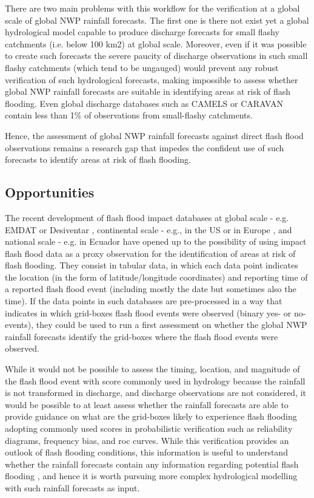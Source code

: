 There are two main problems with this workflow for the verification at a global scale of global NWP rainfall forecasts. The first one is there not exist yet a global hydrological model capable to produce discharge forecasts for small flashy catchments (i.e. below 100 km2) at global scale. Moreover, even if it was possible to create such forecasts the severe paucity of discharge observations in such small flashy catchments (which tend to be ungauged) would prevent any robust verification of such hydrological forecasts, making impossible to assess whether global NWP rainfall forecasts are suitable in identifying areas at risk of flash flooding. Even global discharge databases such as CAMELS or CARAVAN \citep{Kratzert_2023} contain less than 1\% of observations from small-flashy catchments. 

Hence, the assessment of global NWP rainfall forecasts against direct flash flood observations
remains a research gap that impedes the confident use of such forecasts to identify areas at risk of flash flooding.

\subsection{Opportunities}

The recent development of flash flood impact databases at global scale - e.g. EMDAT or Desiventar \citep{cred_2019}, continental scale - e.g., in the US or in Europe \citep{noaa_2019}, and national scale - e.g. in Ecuador  \citep{Bucherie_2022a} have opened up to the possibility of using impact flash flood data as a proxy observation for the identification of areas at risk of flash flooding. They consist in tabular data, in which each data point indicates the location (in the form of latitude/longitude coordinates) and reporting time of a reported flash flood event (including mostly the date but sometimes also the time). If the data points in such databases are pre-processed in a way that indicates in which grid-boxes flash flood events were observed (binary yes- or no-events), they could be used to run a first assessment on whether the global NWP rainfall forecasts identify the grid-boxes where the flash flood events were observed.

While it would not be possible to assess the timing, location, and magnitude of the flash flood event with score commonly used in hydrology because the rainfall is not transformed in discharge, and discharge observations are not considered, it would be possible to at least assess whether the rainfall forecasts are able to provide guidance on what are the grid-boxes likely to experience flash flooding adopting commonly used scores in probabilistic verification such as reliability diagrams, frequency bias, and roc curves. While this verification provides an outlook of flash flooding conditions, this information is useful to understand whether the rainfall forecasts contain any information regarding potential flash flooding \citep{Mason_1979}, and hence it is worth pursuing more complex hydrological modelling with such rainfall forecasts as input. 

